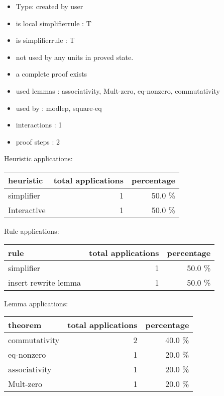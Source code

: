 \documentclass[a4paper]{article}
\begin{document}
\begin{itemize}

\item Type: created by user

\item is local simplifierrule : T
\item is simplifierrule : T
\item not used by any units in proved state.
\item       a complete proof exists
\item       used lemmas  : associativity, Mult-zero, eq-nonzero, commutativity
\item       used by      : modlep, square-eq
\item       interactions : 1
\item       proof steps  : 2
\end{itemize}

\medskip


Heuristic applications:

\begin{supertabular}{l|r|r}
heuristic	& total applications & percentage \\ \hline
simplifier & 1 & 50.0 \% \\
Interactive & 1 & 50.0 \% \\

\end{supertabular}

Rule applications:

\begin{supertabular}{l|r|r}
rule	        & total applications & percentage \\ \hline
simplifier & 1 & 50.0 \% \\
insert rewrite lemma & 1 & 50.0 \% \\

\end{supertabular}

Lemma applications:

\begin{supertabular}{l|r|r}
theorem	        & total applications & percentage \\ \hline
commutativity & 2 & 40.0 \% \\
eq-nonzero & 1 & 20.0 \% \\
associativity & 1 & 20.0 \% \\
Mult-zero & 1 & 20.0 \% \\

\end{supertabular}
\end{document}
